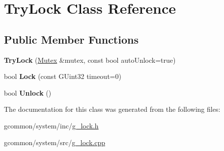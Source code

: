 \hypertarget{class_try_lock}{\section{Try\-Lock Class Reference}
\label{class_try_lock}
}
\subsection*{Public Member Functions}
\begin{DoxyCompactItemize}
\item 
\hypertarget{class_try_lock_a432af9ad803f00fd64282034cdd36c2d}{{\bfseries Try\-Lock} (\hyperlink{class_mutex}{Mutex} \&mutex, const bool auto\-Unlock=true)}\label{class_try_lock_a432af9ad803f00fd64282034cdd36c2d}

\item 
\hypertarget{class_try_lock_ae584c0b7332f95303f959fe2e19df39c}{bool {\bfseries Lock} (const G\-Uint32 timeout=0)}\label{class_try_lock_ae584c0b7332f95303f959fe2e19df39c}

\item 
\hypertarget{class_try_lock_ab432cef2e12b8668fff305e1967cae6c}{bool {\bfseries Unlock} ()}\label{class_try_lock_ab432cef2e12b8668fff305e1967cae6c}

\end{DoxyCompactItemize}


The documentation for this class was generated from the following files\-:\begin{DoxyCompactItemize}
\item 
gcommon/system/inc/\hyperlink{g__lock_8h}{g\-\_\-lock.\-h}\item 
gcommon/system/src/\hyperlink{g__lock_8cpp}{g\-\_\-lock.\-cpp}\end{DoxyCompactItemize}
